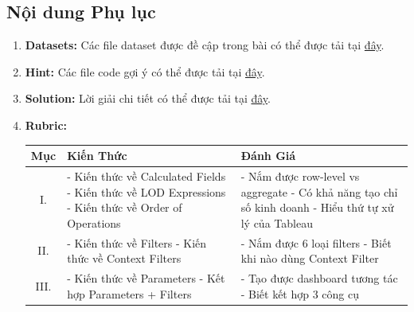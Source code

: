 \documentclass[12pt]{article}
\begin{document}
\newpage
\begin{appendices}

\section{Nội dung Phụ lục}

\begin{enumerate}
    \item \textbf{Datasets:} Các file dataset được đề cập trong bài có thể được tải tại \href{https://aivietnam.edu.vn/}{đây}.
    \item \textbf{Hint:} Các file code gợi ý có thể được tải tại \href{https://aivietnam.edu.vn/}{đây}.
    \item \textbf{Solution:} Lời giải chi tiết có thể được tải tại \href{https://aivietnam.edu.vn/}{đây}.
    \item \textbf{Rubric:}

\begin{longtable}{|c|p{7.5cm}|p{7cm}|}
    \hline
    \textbf{Mục} & \textbf{Kiến Thức} & \textbf{Đánh Giá} \\\hline
    I. &
    - Kiến thức về Calculated Fields \newline
    - Kiến thức về LOD Expressions \newline
    - Kiến thức về Order of Operations
    &
    - Nắm được row-level vs aggregate \newline
    - Có khả năng tạo chỉ số kinh doanh \newline
    - Hiểu thứ tự xử lý của Tableau
    \\\hline
    II. &
    - Kiến thức về Filters \newline
    - Kiến thức về Context Filters
    &
    - Nắm được 6 loại filters \newline
    - Biết khi nào dùng Context Filter
    \\\hline
    III. &
    - Kiến thức về Parameters \newline
    - Kết hợp Parameters + Filters
    &
    - Tạo được dashboard tương tác \newline
    - Biết kết hợp 3 công cụ
    \\\hline
\end{longtable}
\end{enumerate}

\end{appendices}
\end{document}
